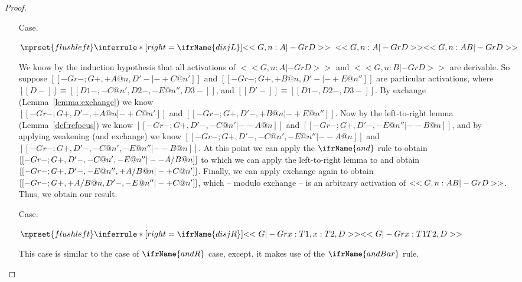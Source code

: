 \begin{proof}
\begin{itemize}
  \item[Case.]\ \\ 
    \begin{center}
      \begin{math}
        $$\mprset{flushleft}
        \inferrule* [right=\ifrName{disjL}] {
          <<G, n : A |- Gr D>>
          \\\\
          <<G, n : A |- Gr D>>
        }{<<G, n : A \/ B |- Gr D>>}
      \end{math}
    \end{center}
    We know by the induction hypothesis that all activations of $<<G, n : A |- Gr D>>$ and
    $<<G, n : B |- Gr D>>$ are derivable.  So suppose $[[-Gr-; {G}+,+{A}@n,{D'}- |- + C @ n']]$ and
    $[[-Gr-; {G}+,+{B}@n,{D'}- |- + E @ n'']]$ are particular activations, 
    where $[[{D}-]] \equiv [[{D1}-,-C@n',{D2}-,-E@n'',{D3}-]]$, and $[[{D'}-]] \equiv [[{D1}-,{D2}-,{D3}-]]$.
    By exchange (Lemma~\ref{lemma:exchange}) we know \\
    $[[-Gr-; {G}+,{D'}-,+{A}@n |- + C @ n']]$ 
    and  $[[-Gr-; {G}+,{D'}-,+{B}@n |- + E @ n'']]$.  Now by the left-to-right lemma (Lemma~\ref{def:refocus}) we know 
    $[[-Gr-; {G}+,{D'}-, - C @ n' |- -{A}@n]]$ and $[[-Gr-; {G}+,{D'}-, - E @ n'' |- -{B}@n]]$, and by applying
    weakening (and exchange) we know $[[-Gr-; {G}+,{D'}-, - C @ n', - E @ n'' |- -{A}@n]]$ and 
    $[[-Gr-; {G}+,{D'}-, -C@n',- E @ n'' |- -{B}@n]]$.  At this point we can apply 
    the $\ifrName{and}$ rule to obtain $[[-Gr-; {G}+,{D'}-, - C @ n',- E @ n'' |- - {A} /\- {B} @ n]]$ to which we can apply
    the left-to-right lemma to and obtain \\
    $[[-Gr-; {G}+,{D'}-,- E @ n'',+ {A} /\- {B} @ n |- + C @ n']]$.  Finally, we can apply 
    exchange again to obtain $[[-Gr-; {G}+, + {A} /\- {B} @ n, {D'}-,- E @ n'' |- + C @ n']]$, which -- modulo exchange -- is
    an arbitrary activation of $<<G, n : A \/ B |- Gr D>>$.   Thus, we obtain our result.
    

  \item[Case.]\ \\ 
    \begin{center}
      \begin{math}
        $$\mprset{flushleft}
        \inferrule* [right=\ifrName{disjR}] {
          <<G |- Gr x : T1, x : T2, D>>
        }{<<G |- Gr x : T1 \/ T2, D>>}
      \end{math}
    \end{center}
    This case is similar to the case of $\ifrName{andR}$ case, except,
    it makes use of the $\ifrName{andBar}$ rule.


\end{itemize}
\end{proof}
